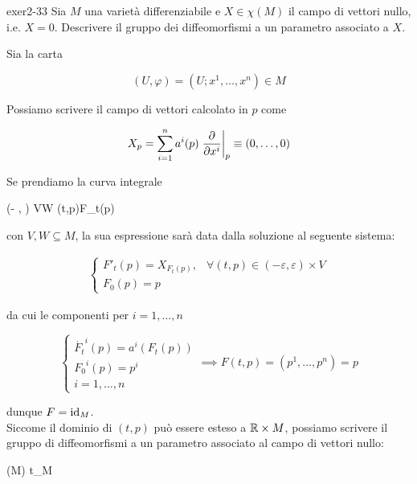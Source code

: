 {exer2-33}
{
Sia $ M $ una varietà differenziabile e $ X \in \chi(M) $ il campo di vettori nullo, i.e. $ X = 0 $. Descrivere il gruppo dei diffeomorfismi a un parametro associato a $ X $.
}
{
Sia la carta

\begin{equation}
	(U, \varphi) = (U; x^{1},\dots,x^{n}) \in M
\end{equation}

Possiamo scrivere il campo di vettori calcolato in $ p $ come

\begin{equation}
	X_{p} = \sum_{i=1}^{n} a^{i}(p) \eval{ \pdv{x^{i}} }_{p} \equiv (0,\dots,0)
\end{equation}

Se prendiamo la curva integrale

	{(- \varepsilon, \varepsilon) \times V}{W}
	{(t,p)}{F_{t}(p)}

con $ V,W \subseteq M $, la sua espressione sarà data dalla soluzione al seguente sistema:

\begin{align}
	\begin{cases}
		F'_{t}(p) = X_{F_{t}(p)}, & \forall (t,p) \in (- \varepsilon, \varepsilon) \times V \\
		F_{0}(p) = p
	\end{cases}
\end{align}

da cui le componenti per $ i = 1,\dots,n $

\begin{equation}
	\begin{cases}
		\dot{F_{t}}^{i}(p) = a^{i}(F_{t}(p)) \\
		{F_{0}}^{i}(p) = p^{i} \\
		i = 1,\dots,n
	\end{cases} %
	\implies %
	F(t,p) = (p^{1},\dots,p^{n}) = p
\end{equation}

dunque $ F = \operatorname{id}_{M} $. \\
Siccome il dominio di $ (t,p) $ può essere esteso a $ \mathbb{R} \times M $, possiamo scrivere il gruppo di diffeomorfismi a un parametro associato al campo di vettori nullo:

	{\R}{(M)}
	{t}{\id_{M}}
}


